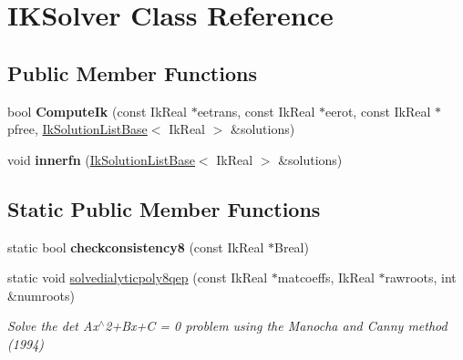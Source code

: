 \hypertarget{classIKSolver}{\section{I\-K\-Solver Class Reference}
\label{classIKSolver}
}
\subsection*{Public Member Functions}
\begin{DoxyCompactItemize}
\item 
\hypertarget{classIKSolver_ac0195e291bed491b4cb6a68db8199b55}{bool {\bfseries Compute\-Ik} (const Ik\-Real $\ast$eetrans, const Ik\-Real $\ast$eerot, const Ik\-Real $\ast$pfree, \hyperlink{classikfast_1_1IkSolutionListBase}{Ik\-Solution\-List\-Base}$<$ Ik\-Real $>$ \&solutions)}\label{classIKSolver_ac0195e291bed491b4cb6a68db8199b55}

\item 
\hypertarget{classIKSolver_a5052994576b6519164e978e851c3237c}{void {\bfseries innerfn} (\hyperlink{classikfast_1_1IkSolutionListBase}{Ik\-Solution\-List\-Base}$<$ Ik\-Real $>$ \&solutions)}\label{classIKSolver_a5052994576b6519164e978e851c3237c}

\end{DoxyCompactItemize}
\subsection*{Static Public Member Functions}
\begin{DoxyCompactItemize}
\item 
\hypertarget{classIKSolver_abecf6ea0c9933661bd0f3caeb0561881}{static bool {\bfseries checkconsistency8} (const Ik\-Real $\ast$Breal)}\label{classIKSolver_abecf6ea0c9933661bd0f3caeb0561881}

\item 
static void \hyperlink{classIKSolver_a058e681da2d434157aad2abbbce6bf02}{solvedialyticpoly8qep} (const Ik\-Real $\ast$matcoeffs, Ik\-Real $\ast$rawroots, int \&numroots)
\begin{DoxyCompactList}\small\item\em Solve the det Ax$^\wedge$2+\-Bx+\-C = 0 problem using the Manocha and Canny method (1994) \end{DoxyCompactList}\end{DoxyCompactItemize}

